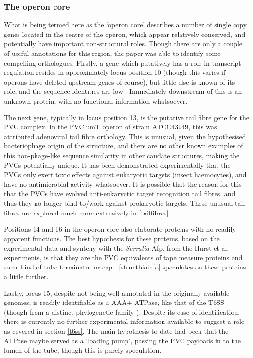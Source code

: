 \subsubsection{The operon core}
What is being termed here as the `operon core' describes a number of single copy genes located in the centre of the operon, which appear relatively conserved, and potentially have important non-structural roles. Though there are only a couple of useful annotations for this region, the \cite{Yang2006} paper was able to identify some compelling orthologues. Firstly, a gene which putatively has a role in transcript regulation resides in approximately locus position 10 (though this varies if operons have deleted upstream genes of course), but little else is known of its role, and the sequence identities are low \citep{Waterfield2009}. Immediately downstream of this is an unknown protein, with no functional information whatsoever.

The next gene, typically in locus position 13, is the putative tail fibre gene for the PVC complex. In the PVClumT operon of strain ATCC43949, this was attributed adenoviral tail fibre orthology. This is unusual, given the hypothesised bacteriophage origin of the structure, and there are no other known examples of this non-phage-like sequence similarity in other caudate structures, making the PVCs potentially unique. It has been demonstrated experimentally that the PVCs only exert toxic effects against eukaryotic targets (insect haemocytes), and have no antimicrobial activity whatsoever. It is possible that the reason for this that the PVCs have evolved anti-eukaryotic target recognition tail fibres, and thus they no longer bind to/work against prokaryotic targets. These unusual tail fibres are explored much more extensively in \vref{tailfibres}.

Positions 14 and 16 in the operon core also elaborate proteins with no readily apparent functions. The best hypothesis for these proteins, based on the experimental data and synteny with the \emph{Serratia} Afp, from the Hurst et al. experiments, is that they are the PVC equivalents of tape measure proteins and some kind of tube terminator or cap \citep{Rybakova2013, Rybakova2015}. \vref{structbioinfo} speculates on these proteins a little further.

Lastly, locus 15, despite not being well annotated in the originally available genomes, is readily identifiable as a AAA+ ATPase, like that of the T6SS (though from a distinct phylogenetic family \citep{Frickey2004}). Despite its ease of identification, there is currently no further experimental information available to suggest a role as covered in section \vref{t6ss}. The main hypothesis to date had been that the ATPase maybe served as a `loading pump', passing the PVC payloads in to the lumen of the tube, though this is purely speculation.

